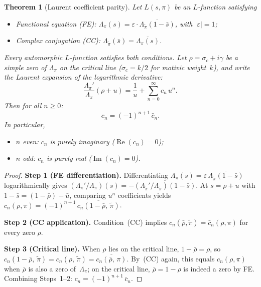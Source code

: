 \documentclass[11pt, a4paper]{article}
\theoremstyle{definition}
\theoremstyle{plain}
\newtheorem{theorem}{Theorem}[section]
\begin{document}
\begin{theorem}[Laurent coefficient parity]
\label{thm:laurent_parity}
Let $L(s,\pi)$ be an $L$-function satisfying
\begin{itemize}
  \item[(i)] \emph{Functional equation (FE):}\;
    $\Lambda_\pi(s) = \varepsilon \cdot \overline{\Lambda_{\tilde\pi}(1-\bar{s})}$,
    with $|\varepsilon|=1$;
  \item[(ii)] \emph{Complex conjugation (CC):}\;
    $\Lambda_{\tilde\pi}(\bar{s}) = \overline{\Lambda_\pi(s)}$.
\end{itemize}
Every automorphic $L$-function satisfies both conditions.
Let $\rho = \sigma_c + i\gamma$ be a simple zero of $\Lambda_\pi$ on the
critical line ($\sigma_c = k/2$ for motivic weight~$k$), and write the
Laurent expansion of the logarithmic derivative:
\[
  \frac{\Lambda_\pi'}{\Lambda_\pi}(\rho + u)
  = \frac{1}{u} + \sum_{n=0}^{\infty} c_n\, u^n.
\]
Then for all $n \ge 0$:
\begin{equation}\label{eq:cn_parity}
  c_n = (-1)^{n+1}\,\bar{c}_n.
\end{equation}
In particular,
\begin{itemize}
  \item $n$ even: $c_n$ is purely imaginary ($\operatorname{Re}(c_n) = 0$);
  \item $n$ odd: $c_n$ is purely real ($\operatorname{Im}(c_n) = 0$).
\end{itemize}
\end{theorem}

\begin{proof}
\textbf{Step 1 (FE differentiation).}\;
Differentiating $\Lambda_\pi(s) = \varepsilon\,\overline{\Lambda_{\tilde\pi}(1-\bar{s})}$
logarithmically gives
$(\Lambda_\pi'/\Lambda_\pi)(s) = -\overline{(\Lambda_{\tilde\pi}'/\Lambda_{\tilde\pi})(1-\bar{s})}$.
At $s = \rho + u$ with $1-\bar{s} = (1-\bar\rho) - \bar{u}$, comparing $u^n$ coefficients yields
$c_n(\rho, \pi) = (-1)^{n+1}\,\overline{c_n(1{-}\bar\rho,\,\tilde\pi)}$.

\textbf{Step 2 (CC application).}\;
Condition~(CC) implies $c_n(\bar\rho, \tilde\pi) = \bar{c}_n(\rho, \pi)$
for every zero $\rho$.

\textbf{Step 3 (Critical line).}\;
When $\rho$ lies on the critical line, $1 - \bar\rho = \rho$, so
$c_n(1{-}\bar\rho,\,\tilde\pi) = c_n(\rho,\,\tilde\pi) = \overline{c_n(\bar\rho,\,\pi)}$.
By~(CC) again, this equals $c_n(\rho,\pi)$ when $\bar\rho$ is also a zero of~$\Lambda_\pi$;
on the critical line, $\bar\rho = 1-\rho$ is indeed a zero by FE.
Combining Steps~1--2:
$c_n = (-1)^{n+1}\,\bar{c}_n$.
\end{proof}
\end{document}
